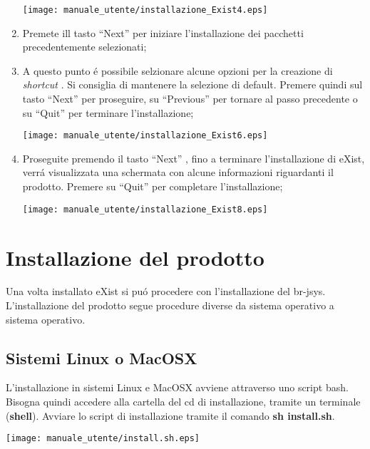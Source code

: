 \begin{enumerate}
\begin{center}
\texttt{[image: manuale\_utente/installazione\_Exist4.eps]}\\
\end{center}
\item Premete ill tasto ``Next'' per iniziare l'installazione dei pacchetti precedentemente selezionati;
\item A questo punto \'e possibile selzionare alcune opzioni per la creazione di \textit{shortcut} . Si consiglia di mantenere la selezione di default. Premere quindi sul tasto ``Next'' per proseguire, su ``Previous'' per tornare al passo precedente o su ``Quit'' per terminare l'installazione;
\begin{center}
\texttt{[image: manuale\_utente/installazione\_Exist6.eps]}\\
\end{center}
\item Proseguite premendo il tasto ``Next'' , fino a terminare l'installazione di eXist, verr\'a visualizzata una schermata con alcune informazioni riguardanti il prodotto. Premere su ``Quit'' per completare l'installazione;
\begin{center}
\texttt{[image: manuale\_utente/installazione\_Exist8.eps]}\\
\end{center}
\end{enumerate}

\section{Installazione del prodotto}
Una volta installato eXist si pu\'o procedere con l'installazione del br-jsys.
L'installazione del prodotto segue procedure diverse da sistema operativo a sistema operativo.
\subsection{Sistemi Linux o MacOSX}
L'installazione in sistemi Linux e MacOSX avviene attraverso uno script bash. Bisogna quindi  accedere alla cartella del cd di installazione,  tramite un terminale (\textbf{shell}). Avviare lo script di installazione tramite il comando \textbf{sh install.sh}.
\begin{center}
\texttt{[image: manuale\_utente/install.sh.eps]}\\
\end{center}


